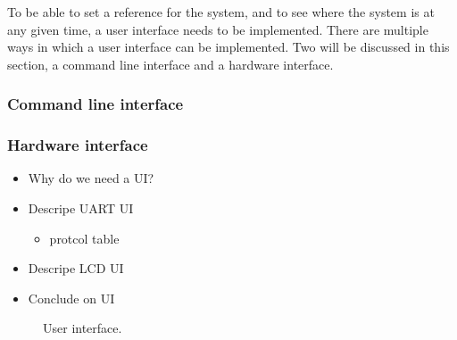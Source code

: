 \documentclass[../../../main]{subfiles}
\begin{document}
To be able to set a reference for the system, and to see where the system is at any given time, a user interface needs to be implemented.
There are multiple ways in which a user interface can be implemented. 
Two will be discussed in this section, a command line interface and a hardware interface.

\subsubsection{Command line interface}%
\label{ssub:command_line_interface}



\subsubsection{Hardware interface}%
\label{ssub:hardware_interface}



\begin{itemize}
    \item Why do we need a UI? 
    \item Descripe UART UI
        \begin{itemize}
            \item protcol table
        \end{itemize}
    \item Descripe LCD UI
    \item Conclude on UI 
\end{itemize}



\begin{figure}[H]
  \centering
  \def\svgwidth{\textwidth}
  
  \caption{User interface.}
  \label{fig:User_interface}
\end{figure}
\end{document}
